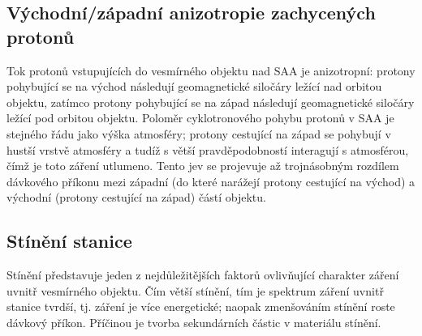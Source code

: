 \subsection{Východní/západní anizotropie zachycených protonů}
Tok protonů vstupujících do vesmírného objektu nad SAA je anizotropní: protony pohybující se na východ následují geomagnetické siločáry ležící nad orbitou objektu, zatímco protony pohybující se na západ následují geomagnetické siločáry ležící pod orbitou objektu. Poloměr cyklotronového pohybu protonů v SAA je stejného řádu jako výška atmosféry; protony cestující na západ se pohybují v hustší vrstvě atmosféry a tudíž s větší pravděpodobností interagují s atmosférou, čímž je toto záření utlumeno. Tento jev se projevuje až trojnásobným rozdílem dávkového příkonu mezi západní (do které narážejí protony cestující na východ) a východní (protony cestující na západ) částí objektu.
\subsection{Stínění stanice}
Stínění představuje jeden z nejdůležitějších faktorů ovlivňující charakter záření uvnitř vesmírného objektu. Čím větší stínění, tím je spektrum záření uvnitř stanice tvrdší, tj. záření je více energetické; naopak zmenšováním stínění roste dávkový příkon. Příčinou je tvorba sekundárních částic v materiálu stínění.

